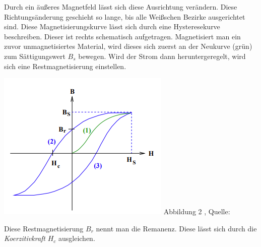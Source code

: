 \begin{minipage}{0.7\textwidth}
    Durch ein äußeres Magnetfeld lässt sich diese Ausrichtung verändern.
    Diese Richtungsänderung geschieht so lange, bis alle Weißschen Bezirke ausgerichtet sind.
    Diese Magnetisierungskurve lässt sich durch eine Hysteresekurve beschreiben.
    Dieser ist rechts schematisch aufgetragen.
    Magnetisiert man ein zuvor unmagnetisiertes Material, wird dieses sich zuerst an der Neukurve (grün) zum Sättigungswert $B_{s}$ bewegen.
    Wird der Strom dann heruntergeregelt, wird sich eine Restmagnetisierung einstellen.
\end{minipage}
\begin{minipage}{0.3\textwidth}
    \includegraphics[width=\textwidth]{pictures/Hysteresekurve.png}
    \small{Abbildung 2 , Quelle: \cite{sample}}
\end{minipage}

Diese Restmagnetisierung $B_{r}$ nennt man die Remanenz.
Diese lässt sich durch die \textit{Koerzitivkraft} $H_{c}$ ausgleichen.